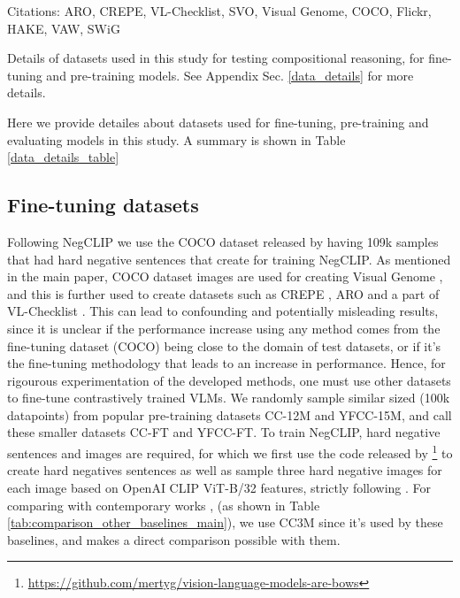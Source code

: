 \documentclass[11pt]{article}
\newcommand{\negclip}{NegCLIP}
\begin{document}
\begin{table*}[h!]
  Citations: ARO\citep{yuksekgonul2022and}, CREPE\citep{ma2022crepe}, VL-Checklist\citep{zhao2022vlchecklist}, SVO\citep{hendricks-nematzadeh-2021-probing}, Visual Genome\citep{krishnavisualgenome}, COCO\citep{lin2014microsoft}, Flickr\citep{flickr}, HAKE\citep{hake}, VAW\citep{vaw}, SWiG\citep{swig} 
  \caption{Details of datasets used in this study for testing compositional reasoning, for fine-tuning and pre-training models. See Appendix Sec. \ref{data_details} for more details.}
  \label{data_details_table}
\end{table*}
Here we provide detailes about datasets used for fine-tuning, pre-training and evaluating models in this study. A summary is shown in Table \ref{data_details_table}
\subsection{Fine-tuning datasets}
Following \negclip{} \citep{yuksekgonul2022and} we use the COCO dataset released by \citep{yuksekgonul2022and} having 109k samples that had hard negative sentences that \citep{yuksekgonul2022and} create for training NegCLIP. As mentioned in the main paper, COCO dataset images are used for creating Visual Genome \citep{krishnavisualgenome}, and this is further used to create datasets such as CREPE \citep{ma2022crepe}, ARO \citep{yuksekgonul2022and} and a part of VL-Checklist \citep{zhao2022vlchecklist}. This can lead to confounding and potentially misleading results, since it is unclear if the performance increase using any method comes from the fine-tuning dataset (COCO) being close to the domain of test datasets, or if it's the fine-tuning methodology that leads to an increase in performance. Hence, for rigourous experimentation of the developed methods, one must use other datasets to fine-tune contrastively trained VLMs. We randomly sample similar sized (100k datapoints) from popular pre-training datasets CC-12M and YFCC-15M, and call these smaller datasets CC-FT and YFCC-FT. To train \negclip{}, hard negative sentences and images are required, for which we first use the code released by \citep{yuksekgonul2022and}\footnote{\url{https://github.com/mertyg/vision-language-models-are-bows}} to create hard negatives sentences as well as sample three hard negative images for each image based on OpenAI CLIP ViT-B/32 features, strictly following \citep{yuksekgonul2022and}.
For comparing with contemporary works \citep{doveh2023teaching}, \citep{cascantebonilla2023going} (as shown in Table \ref{tab:comparison_other_baselines_main}), we use CC3M \citep{sharma-etal-2018-conceptual} since it's used by these baselines, and makes a direct comparison possible with them.
\end{document}
